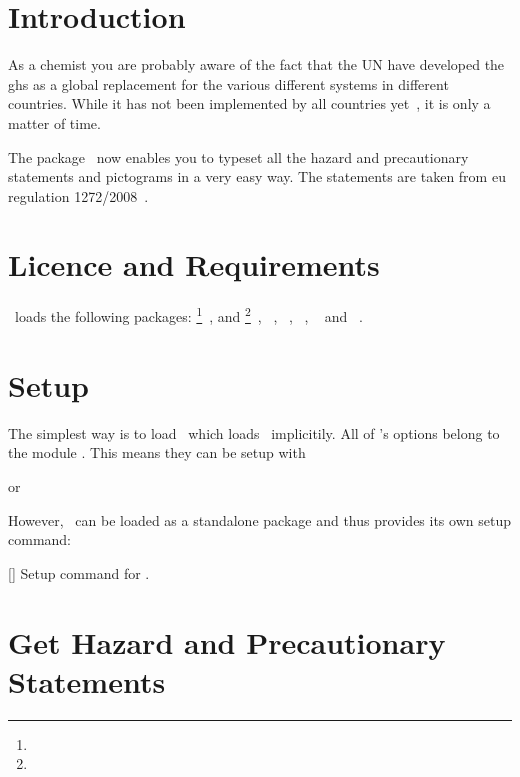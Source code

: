 \documentclass[load-preamble+]{cnltx-doc}
\begin{document}
\section{Introduction}
As a chemist you are probably aware of the fact that the \acl{UN} have
developed the \ac{ghs} as a global replacement for the various different
systems in different countries.  While it has not been implemented by all
countries yet~\cite{unece:ghsystem_implementation}, it is only a matter of
time.

The package \ghsystem\ now enables you to typeset all the hazard and
precautionary statements and pictograms in a very easy way.  The statements
are taken from \acs{eu} regulation 1272/2008~\cite{eu:ghsystem_regulation}.

\section{Licence and Requirements}
\license

\ghsystem\ loads the following packages:
\footnote{}~\cite{bnd:l3kernel},  and
\footnote{}~\cite{bnd:l3packages},
~\cite{pkg:translations},
~\cite{pkg:siunitx},
~\cite{pkg:graphicx},
~\cite{pkg:longtable} and
~\cite{pkg:ifpdf}.

\section{Setup}
The simplest way is to load \chemmacros\ which loads \ghsystem\ implicitily.
All of \ghsystem's options belong to the module .  This means
they can be setup with
\begin{sourcecode}
   or
\end{sourcecode}
However, \ghsystem\ can be loaded as a standalone package
and thus provides its own setup command:
\begin{commands}
  []
    Setup command for \ghsystem.
\end{commands}

\section{Get Hazard and Precautionary Statements}
\end{document}
